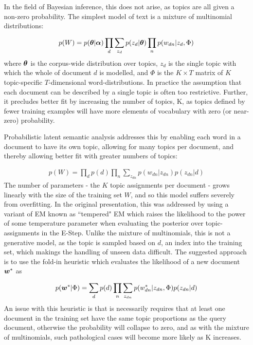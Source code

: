 In the field of Bayesian inference, this does not arise, as topics are all given a non-zero probability. The simplest model of text is a mixture of multinomial distributions\cite{Nigam2000}:

\begin{align}
p(W) = p(\bm \theta|\bm \alpha) \prod_d \sum_{z_d} p(z_d|\bm \theta)\prod_n p(w_{dn} | z_d, \Phi)
\end{align}
where $\bm \theta$ is the corpus-wide distribution over topics, $z_d$ is the single topic with which the whole of document $d$ is modelled, and $\Phi$ is the $K \times T$ matrix of $K$ topic-specific $T$-dimensional word-distributions. In practice the assumption that each document can be described by a single topic is often too restrictive. Further, it precludes better fit by increasing the number of topics, K, as topics defined by fewer training examples will have more elements of vocabulary with zero (or near-zero) probability.

Probabilistic latent semantic analysis\cite{Hofmann1999a} addresses this by enabling each word in a document to have its own topic, allowing for many topics per document, and thereby allowing better fit with greater numbers of topics:

\begin{align}
p(W) = \prod_d p(d) \prod_n \sum_{z_{dn}} p(w_{dn}|z_{dn})p(z_{dn}|d)
\end{align}
The number of parameters - the $K$ topic assignments per document - grows linearly with the size of the training set $W$, and so this model suffers severely from overfitting. In the original presentation, this was addressed by using a variant of EM known as ``tempered" EM which raises the likelihood to the power of some temperature parameter when evaluating the posterior over topic-assignments in the E-Step. Unlike the mixture of multinomials, this is not a generative model, as the topic is sampled based on $d$, an index into the training set, which makings the handling of unseen data difficult. The suggested approach is to use the fold-in heuristic which evaluates the likelihood of a new document $\bm w^*$ as

\begin{align}
p(\bm w^*|\Phi) = \sum_d p(d) \prod_n \sum_{z_{dn}} p(w_{dn}^*|z_{dn}, \Phi) p(z_{dn}|d)
\end{align}
An issue with this heuristic is that is necessarily requires that at least one document in the training set have the same topic proportions as the query document, otherwise the probability will collapse to zero, and as with the mixture of multinomials, such pathological cases will become more likely as K increases.

